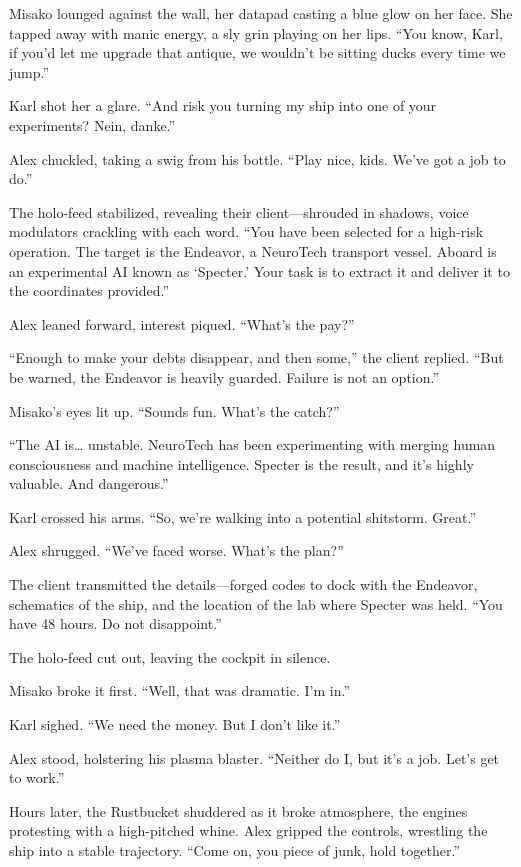 \documentclass[12pt]{book}
\begin{document}
Misako lounged against the wall, her datapad casting a blue glow on her face. She tapped away with manic energy, a sly grin playing on her lips. \enquote{You know, Karl, if you’d let me upgrade that antique, we wouldn’t be sitting ducks every time we jump.}

Karl shot her a glare. \enquote{And risk you turning my ship into one of your experiments? Nein, danke.}

Alex chuckled, taking a swig from his bottle. \enquote{Play nice, kids. We’ve got a job to do.}

The holo-feed stabilized, revealing their client---shrouded in shadows, voice modulators crackling with each word. \enquote{You have been selected for a high-risk operation. The target is the Endeavor, a NeuroTech transport vessel. Aboard is an experimental AI known as ‘Specter.’ Your task is to extract it and deliver it to the coordinates provided.}

Alex leaned forward, interest piqued. \enquote{What’s the pay?}

\enquote{Enough to make your debts disappear, and then some,} the client replied. \enquote{But be warned, the Endeavor is heavily guarded. Failure is not an option.}

Misako’s eyes lit up. \enquote{Sounds fun. What’s the catch?}

\enquote{The AI is… unstable. NeuroTech has been experimenting with merging human consciousness and machine intelligence. Specter is the result, and it’s highly valuable. And dangerous.}

Karl crossed his arms. \enquote{So, we’re walking into a potential shitstorm. Great.}

Alex shrugged. \enquote{We’ve faced worse. What’s the plan?}

The client transmitted the details---forged codes to dock with the Endeavor, schematics of the ship, and the location of the lab where Specter was held. \enquote{You have 48 hours. Do not disappoint.}

The holo-feed cut out, leaving the cockpit in silence.

Misako broke it first. \enquote{Well, that was dramatic. I’m in.}

Karl sighed. \enquote{We need the money. But I don’t like it.}

Alex stood, holstering his plasma blaster. \enquote{Neither do I, but it’s a job. Let’s get to work.}

Hours later, the Rustbucket shuddered as it broke atmosphere, the engines protesting with a high-pitched whine. Alex gripped the controls, wrestling the ship into a stable trajectory. \enquote{Come on, you piece of junk, hold together.}
\end{document}
